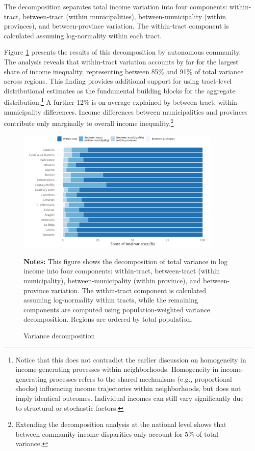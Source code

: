 The decomposition separates total income variation into four components: within-tract, between-tract (within municipalities), between-municipality (within provinces), and between-province variation. The within-tract component is calculated assuming log-normality within each tract.

Figure \ref{fig:variance_decomp} presents the results of this decomposition by autonomous community. The analysis reveals that within-tract variation accounts by far for the largest share of income inequality, representing between 85\% and 91\% of total variance across regions. This finding provides additional support for using tract-level distributional estimates as the fundamental building blocks for the aggregate distribution.\footnote{Notice that this does not contradict the earlier discussion on homogeneity in income-generating processes within neighborhoods. Homogeneity in income-generating processes refers to the shared mechanisms (e.g., proportional shocks) influencing income trajectories within neighborhoods, but does not imply identical outcomes. Individual incomes can still vary significantly due to structural or stochastic factors.} A further 12\% is on average explained by between-tract, within-municipality differences. Income differences between municipalities and provinces contribute only marginally to overall income inequality.\footnote{Extending the decomposition analysis at the national level shows that between-community income disparities only account for 5\% of total variance.}

\begin{figure}[H]
\begin{center}
\captionsetup{justification=centering}
\caption{Variance decomposition}
\label{fig:variance_decomp}
\includegraphics[width=0.9\textwidth]{output/variance_decomp.png}
\end{center}
\begin{fignotes2}
\textbf{Notes:} This figure shows the decomposition of total variance in log income into four components: within-tract, between-tract (within municipality), between-municipality (within province), and between-province variation. The within-tract component is calculated assuming log-normality within tracts, while the remaining components are computed using population-weighted variance decomposition. Regions are ordered by total population. 
\end{fignotes2}
\end{figure}